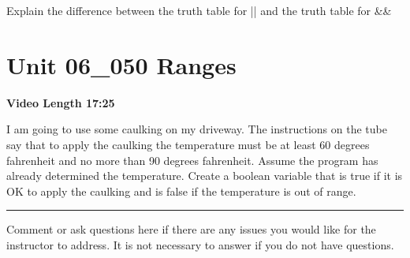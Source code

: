 \documentclass[letterpaper,12pt]{exam}
\newcommand{\unit}{Unit 06}
\begin{document}
\begin{questions}
\begin{samepage}
    \question Explain the difference between the truth table for || and the truth table for &&
    \vspace{25mm}
\end{samepage}

\section*{\unit\_050 Ranges} %
\noindent \textbf{Video Length 17:25}

\begin{samepage}
    \question I am going to use some caulking on my driveway.  The instructions on the tube say that to apply the caulking the temperature must be at least 60 degrees fahrenheit and no more than 90 degrees fahrenheit.  Assume the program has already determined the temperature.  Create a boolean variable that is true if it is OK to apply the caulking and is false if the temperature is out of range.
    \vspace{5mm}
\end{samepage}

\begin{samepage}
    \begin{center}
    \rule{0.8\textwidth}{.4pt}
    \end{center}
	\question Comment or ask questions here if there are any issues you would like for the instructor to address.  It is not necessary to answer if you do not have questions.
	\vspace{30mm}
\end{samepage}

\end{questions}
\end{document}
